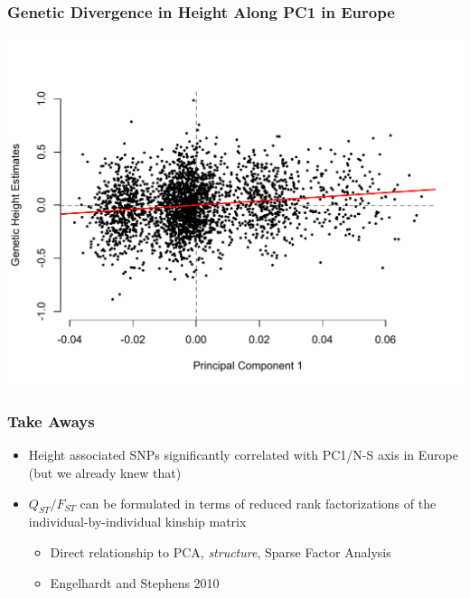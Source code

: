 \documentclass{beamer}
\begin{document}
\begin{frame}
\frametitle{Genetic Divergence in Height Along PC1 in Europe}
\includegraphics[height = \textheight]{../Figs/HeightVPC1.pdf}
\end{frame}

%

\begin{frame}
\frametitle{Take Aways}
	\begin{itemize}
		\item Height associated SNPs significantly correlated with PC1/N-S axis in Europe (but we already knew that)
		\pause
		\item $Q_{ST}/F_{ST}$ can be formulated in terms of reduced rank factorizations of the individual-by-individual kinship matrix
			\begin{itemize}
				\item Direct relationship to PCA, \textit{structure}, Sparse Factor Analysis
				\item Engelhardt  and Stephens 2010
			\end{itemize}
	\end{itemize}
\end{frame}
\end{document}
